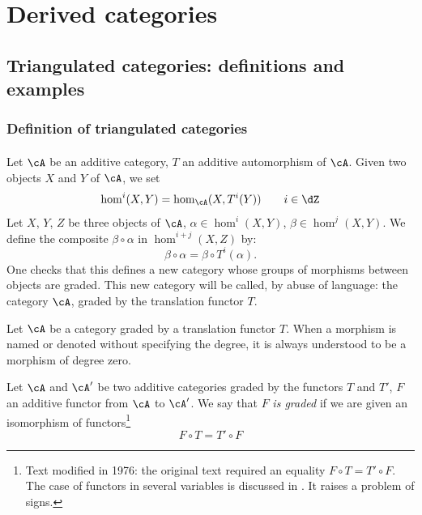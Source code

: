 
\chapter{Derived categories}\label{VIII}










\section{Triangulated categories: definitions and examples}\label{VIII:1}





\subsection{Definition of triangulated categories}\label{VIII:1-1}


\addtocounter{subsubsection}{-1}
\subsubsection{}\label{VIII:1-1-0}

Let $\cA$ be an additive category, $T$ an additive automorphism of $\cA$.
Given two objects $X$ and $Y$ of $\cA$, we set 
\[
  \hom^i(X,Y) = \hom_\cA(X,T^i(Y)) \qquad i\in \dZ 
\]
Let $X$, $Y$, $Z$ be three objects of $\cA$, $\alpha\in \hom^i(X,Y)$,
$\beta\in \hom^j(X,Y)$. We define the composite $\beta\circ\alpha$
in $\hom^{i+j}(X,Z)$ by: 
\[
  \beta\circ \alpha = \beta\circ T^i(\alpha) \text{.}
\]
One checks that this defines a new category whose groups of
morphisms between objects are graded. This new category will be
called, by abuse of language: the category $\cA$, graded by the
translation functor $T$.

Let $\cA$ be a category graded by a translation functor $T$.
When a morphism is named or denoted without specifying the degree, it
is always understood to be a morphism of degree zero.

Let $\cA$ and $\cA'$ be two additive categories graded by the functors
$T$ and $T'$, $F$ an additive functor from $\cA$ to $\cA'$. We say that $F$
\emph{is graded} if we are given an isomorphism of
functors\footnote{Text modified in 1976: the original text required an
equality $F\circ T=T'\circ F$. The case of functors in several variables
is discussed in \cite[XVIII 0.2]{sga4}. It raises a problem of signs.} 
\[
  F\circ T = T'\circ F 
\]

